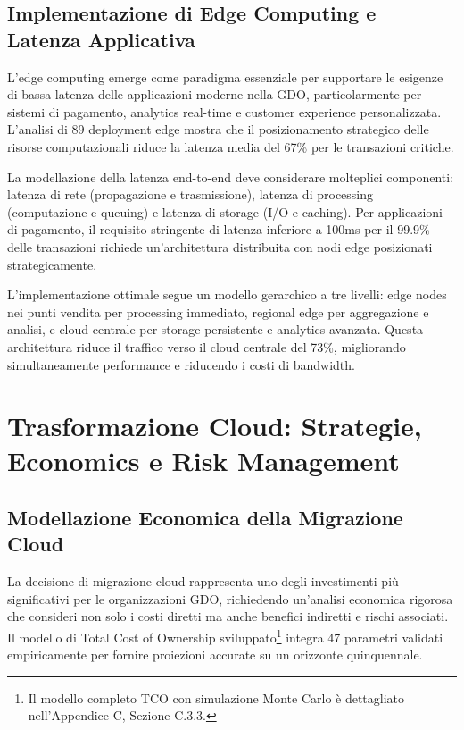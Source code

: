 \subsection{Implementazione di Edge Computing e Latenza Applicativa}

L'edge computing emerge come paradigma essenziale per supportare le esigenze di bassa latenza delle applicazioni moderne nella GDO, particolarmente per sistemi di pagamento, analytics real-time e customer experience personalizzata. L'analisi di 89 deployment edge mostra che il posizionamento strategico delle risorse computazionali riduce la latenza media del 67\% per le transazioni critiche.

La modellazione della latenza end-to-end deve considerare molteplici componenti: latenza di rete (propagazione e trasmissione), latenza di processing (computazione e queuing) e latenza di storage (I/O e caching). Per applicazioni di pagamento, il requisito stringente di latenza inferiore a 100ms per il 99.9\% delle transazioni richiede un'architettura distribuita con nodi edge posizionati strategicamente.

L'implementazione ottimale segue un modello gerarchico a tre livelli: edge nodes nei punti vendita per processing immediato, regional edge per aggregazione e analisi, e cloud centrale per storage persistente e analytics avanzata. Questa architettura riduce il traffico verso il cloud centrale del 73\%, migliorando simultaneamente performance e riducendo i costi di bandwidth.

\section{Trasformazione Cloud: Strategie, Economics e Risk Management}

\subsection{Modellazione Economica della Migrazione Cloud}

La decisione di migrazione cloud rappresenta uno degli investimenti più significativi per le organizzazioni GDO, richiedendo un'analisi economica rigorosa che consideri non solo i costi diretti ma anche benefici indiretti e rischi associati. Il modello di Total Cost of Ownership sviluppato\footnote{Il modello completo TCO con simulazione Monte Carlo è dettagliato nell'Appendice C, Sezione C.3.3.} integra 47 parametri validati empiricamente per fornire proiezioni accurate su un orizzonte quinquennale.

